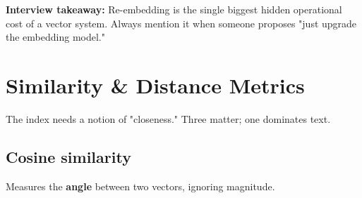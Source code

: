 \documentclass[11pt]{article}
\newenvironment{Shaded}{\begin{snugshade}}{\end{snugshade}}
\newcommand{\ControlFlowTok}[1]{\textcolor[rgb]{0.99,0.74,0.29}{\textbf{#1}}}
\newcommand{\DecValTok}[1]{\textcolor[rgb]{0.96,0.45,0.00}{#1}}
\newcommand{\ErrorTok}[1]{\textcolor[rgb]{0.85,0.27,0.33}{\underline{#1}}}
\newcommand{\FloatTok}[1]{\textcolor[rgb]{0.96,0.45,0.00}{#1}}
\newcommand{\NormalTok}[1]{\textcolor[rgb]{0.81,0.81,0.76}{#1}}
\newcommand{\OperatorTok}[1]{\textcolor[rgb]{0.81,0.81,0.76}{#1}}
\begin{document}
\begin{Shaded}
\end{Shaded}

\textbf{Interview takeaway:} Re-embedding is the single biggest hidden operational cost of a vector system. Always mention it when someone proposes "just upgrade the embedding model."

\section{Similarity \& Distance Metrics}\label{similarity--distance-metrics}

The index needs a notion of "closeness." Three matter; one dominates text.

\subsection{Cosine similarity}\label{cosine-similarity}

Measures the \textbf{angle} between two vectors, ignoring magnitude.
\end{document}
